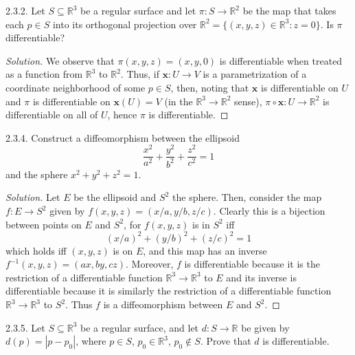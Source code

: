 \documentclass[10pt]{scrartcl}
\providecommand{\RR}{\mathbb R}
\providecommand{\inv}{^{-1}}
\providecommand{\mb}[1]{\mathbf{#1}}
\newenvironment{soln}{\begin{proof}[Solution]}{\end{proof}}
\begin{document}
\begin{problem*}2.3.2.
	Let $S\subseteq\RR^3$ be a regular surface and let
	$\pi\colon S\to\RR^2$ be the map that takes each $p\in S$
	into its orthogonal projection over $\RR^2 = \{(x,y,z)\in\RR^3 : z=0\}$.
	Is $\pi$ differentiable?
\end{problem*}

\begin{soln}
	We observe that $\pi(x,y,z) = (x,y,0)$ is differentiable
	when treated as a function from $\RR^3$ to $\RR^2$.
	Thus, if $\mb x\colon U\to V$ is a parametrization of
	a coordinate neighborhood of some $p\in S$,
	then, noting that $\mb x$ is differentiable on $U$
	and $\pi$ is differentiable on $\mb x(U) = V$
	(in the $\RR^3\to\RR^2$ sense),
	$\pi\circ \mb x\colon U\to\RR^2$ is differentiable on all of $U$,
	hence $\pi$ is differentiable.
\end{soln}

\begin{problem*}2.3.4.
	Construct a diffeomorphism between the ellipsoid
	\[\frac{x^2}{a^2} + \frac{y^2}{b^2} + \frac{z^2}{c^2} = 1\]
	and the sphere $x^2 + y^2 + z^2 = 1$.
\end{problem*}

\begin{soln}
	Let $E$ be the ellipsoid and $S^2$ the sphere.
	Then, consider the map $f\colon E\to S^2$ given by
	$f(x,y,z) = (x/a,y/b,z/c)$. Clearly this is a bijection
	between points on $E$ and $S^2$, for $f(x,y,z)$ is in $S^2$ iff
	\[(x/a)^2 + (y/b)^2 + (z/c)^2 = 1\]
	which holds iff $(x,y,z)$ is on $E$, and this map has an inverse
	$f\inv(x,y,z) = (ax,by,cz)$.
	Moreover, $f$ is differentiable because it is the restriction of
	a differentiable function $\RR^3\to\RR^3$ to $E$
	and its inverse is differentiable because it is similarly
	the restriction of a differentiable function $\RR^3\to\RR^3$ to $S^2$.
	Thus $f$ is a diffeomorphism between $E$ and $S^2$.
\end{soln}

\begin{problem*}2.3.5.
	Let $S\subseteq\RR^3$ be a regular surface, and let
	$d\colon S\to\RR$ be given by $d(p) = |p - p_0|$, where
	$p\in S$, $p_0\in\RR^3$, $p_0\notin S$.
	Prove that $d$ is differentiable.
\end{problem*}
\end{document}
